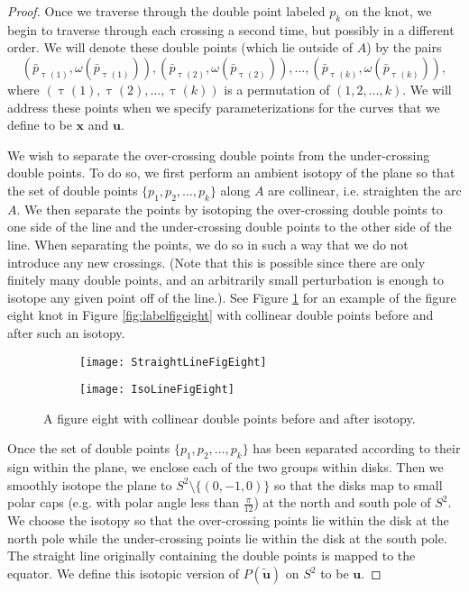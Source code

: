 \documentclass[12pt]{article}
\numberwithin{equation}{subsection}
\theoremstyle{definition}
\numberwithin{lem}{section}
\begin{document}
\begin{proof}
Once we traverse through the double point labeled $p_k$ on the knot, we begin to traverse through each crossing a second time, but possibly in a different order.  We will denote these double points (which lie outside of $A$) by the pairs 
$$\left(\bar{p}_{\uptau(1)}, \omega(\bar{p}_{\uptau(1)})\right), \left(\bar{p}_{\uptau(2)}, \omega(\bar{p}_{\uptau(2)})\right), \ldots, \left(\bar{p}_{\uptau(k)}, \omega(\bar{p}_{\uptau(k)})\right),$$
where $(\uptau(1), \uptau(2), \ldots, \uptau(k))$ is a permutation of $(1,2,\ldots,k)$.  We will address these points when we specify parameterizations for the curves that we define to be $\mathbf{x}$ and $\mathbf{u}$.

We wish to separate the over-crossing double points from the under-crossing double points.  To do so, we first perform an ambient isotopy of the plane so that the set of double points $\{p_1, p_2, \ldots, p_k\}$ along $A$ are collinear, i.e. straighten the arc $A$.  We then separate the points by isotoping the over-crossing double points to one side of the line and the under-crossing double points to the other side of the line.  When separating the points, we do so in such a way that we do not introduce any new crossings.  (Note that this is possible since there are only finitely many double points, and an arbitrarily small perturbation is enough to isotope any given point off of the line.). See Figure \ref{fig:linefigeight} for an example of the figure eight knot in Figure \ref{fig:labelfigeight} with collinear double points before and after such an isotopy.

\begin{figure}[h]
\begin{center}
   \begin{subfigure}[b]{0.48\textwidth}
                \centering
		\texttt{[image: StraightLineFigEight]}
    \end{subfigure} 
   \begin{subfigure}[b]{0.48\textwidth}
                \centering
		\texttt{[image: IsoLineFigEight]}
    \end{subfigure}
\end{center}
\caption{A figure eight with collinear double points before and after isotopy.}
\label{fig:linefigeight}
\end{figure}

Once the set of double points $\{p_1, p_2, \ldots, p_k\}$ has been separated according to their sign within the plane, we enclose each of the two groups within disks.  Then we smoothly isotope the plane to $S^2 \setminus \{(0, -1, 0)\}$ so that the disks map to small polar caps (e.g. with polar angle less than $\frac{\pi}{12}$) at the north and south pole of $S^2$.  We choose the isotopy so that the over-crossing points lie within the disk at the north pole while the under-crossing points lie within the disk at the south pole.  The straight line  originally containing the double points is mapped to the equator.  We define this isotopic version of $P(\tilde{\mathbf{u}})$ on $S^2$ to be $\mathbf{u}$.


\end{proof}
\end{document}
